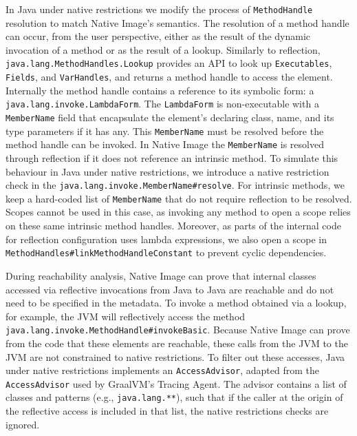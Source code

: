 In Java under native restrictions we modify the process of \verb|MethodHandle| resolution to match Native Image's semantics.
The resolution of a method handle can occur, from the user perspective, either as the result of the dynamic invocation of a method or as the result of a lookup.
Similarly to reflection, \verb|java.lang.MethodHandles.Lookup| provides an API to look up \verb|Executables|, \verb|Fields|, and \verb|VarHandles|, and returns a method handle to access the element. Internally the method handle contains a reference to its symbolic form: a \verb|java.lang.invoke.LambdaForm|. The \verb|LambdaForm| is non-executable with a \verb|MemberName| field that encapsulate the element's declaring class, name, and its type parameters if it has any. This \verb|MemberName| must be resolved before the method handle can be invoked. 
In Native Image the \verb|MemberName| is resolved through reflection if it does not reference an intrinsic method. To simulate this behaviour in Java under native restrictions, we introduce a native restriction check in the \verb|java.lang.invoke.MemberName#resolve|. 
For intrinsic methods, we keep a hard-coded list of \verb|MemberName| that do not require reflection to be resolved. Scopes cannot be used in this case, as invoking any method to open a scope relies on these same intrinsic method handles.
Moreover, as parts of the internal code for reflection configuration uses lambda expressions, we also open a scope in \verb|MethodHandles#linkMethodHandleConstant| to prevent cyclic dependencies.

During reachability analysis, Native Image can prove that internal classes accessed via reflective invocations from Java to Java are reachable and do not need to be specified in the metadata. 
To invoke a method obtained via a lookup, for example, the JVM will reflectively access the method \verb|java.lang.invoke.MethodHandle#invokeBasic|. Because Native Image can prove from the code that these elements are reachable, these calls from the JVM to the JVM are not constrained to native restrictions. To filter out these accesses, Java under native restrictions implements an \verb|AccessAdvisor|, adapted from the \verb|AccessAdvisor| used by GraalVM's Tracing Agent. The advisor contains a list of classes and patterns (e.g., \verb|java.lang.**|), such that if the caller at the origin of the reflective access is included in that list, the native restrictions checks are ignored.

